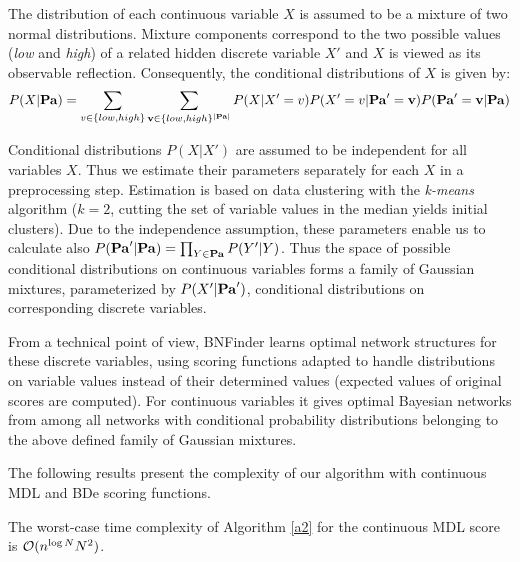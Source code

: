 The distribution of each continuous variable $X$ is assumed to be 
a mixture of two normal distributions.
Mixture components correspond to the two possible values 
(\emph{low} and \emph{high}) of a related hidden discrete variable $X'$
and $X$ is viewed as its observable reflection.
Consequently, the conditional distributions of $X$ is given by:
$$
P(X|\mathbf{Pa})=
\sum_{v\in\{low, high\}}\sum_{\mathbf{v}\in\{low, high\}^{|\mathbf{Pa}|}}P(X|X'=v)P(X'=v|\mathbf{Pa}'=\mathbf{v})P(\mathbf{Pa}'=\mathbf{v}|\mathbf{Pa})
$$

Conditional distributions $P(X|X')$ are assumed to be independent 
for all variables $X$.
Thus we estimate their parameters separately for each $X$ in a preprocessing step.
Estimation is based on data clustering with the \emph{k-means} algorithm 
($k=2$, cutting the set of variable values in the median yields initial clusters).
Due to the independence assumption, these parameters enable us to calculate also
$P(\mathbf{Pa}'|\mathbf{Pa})=\prod_{Y\in\mathbf{Pa}}P(Y'|Y)$.
Thus the space of possible conditional distributions on continuous variables
forms a family of Gaussian mixtures, parameterized by $P(X'|\mathbf{Pa}')$, 
conditional distributions on corresponding discrete variables.

From a technical point of view,
BNFinder learns optimal network structures for these discrete variables, 
using scoring functions adapted to handle 
distributions on variable values instead of their determined values
(expected values of original scores are computed).
For continuous variables it gives optimal Bayesian networks from among 
all networks with conditional probability distributions
belonging to the above defined family of Gaussian mixtures.


The following results present the complexity of our algorithm 
with continuous MDL and BDe scoring functions.

 \begin{theorem}
 The worst-case time complexity of Algorithm \ref{a2} for the continuous MDL score is $\mathcal{O}(n^{\log N}N^2)$.
 \end{theorem}
 
